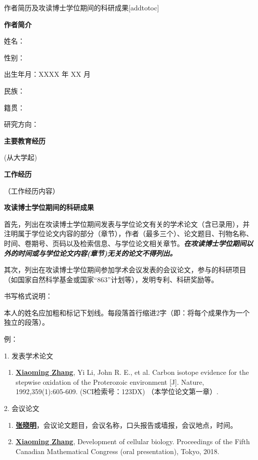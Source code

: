 
\begin{personalcv}{作者简历及攻读博士学位期间的科研成果}[addtotoc]

{\bf 作者简介}

姓名：

性别：

出生年月：XXXX 年 XX 月

民族：

籍贯：

研究方向：

{\bf 主要教育经历}

(从大学起)

{\bf 工作经历}

（工作经历内容）

{\bf 攻读博士学位期间的科研成果}

首先，列出在攻读博士学位期间发表与学位论文有关的学术论文（含已录用），并注明属于学位论文内容的部分（章节），作者（最多三个）、论文题目、刊物名称、时间、卷期号、页码以及检索信息、与学位论文相关章节。{\bfseries\itshape 在攻读博士学位期间以外的时间或与学位论文内容(章节)无关的论文不得列出。}

其次，列出在攻读博士学位期间参加学术会议发表的会议论文，参与的科研项目（如国家自然科学基金或国家“863”计划等），发明专利、科研奖励等。

书写格式说明：

本人的姓名应加粗和标记下划线。每段落首行缩进2字（即：将每个成果作为一个独立的段落）。

例：

1. 发表学术论文
\begin{enumerate}[nosep, label=$\lbrack$\arabic*$\rbrack$]
  \item{\underline{\bf Xiaoming Zhang}, Yi Li, John R. E., et al. Carbon isotope evidence for the stepwise oxidation of the Proterozoic environment [J]. Nature, 1992,359(1):605-609. (SCI检索号：123DX) （本学位论文第一章）.}
\end{enumerate}{}\vspace{1em}

2. 会议论文
\begin{enumerate}[nosep, label=$\lbrack$\arabic*$\rbrack$]
  \item{\underline{\bf 张晓明}，会议论文题目，会议名称，口头报告或墙报，会议地点，时间。}
  \item{\underline{\bf Xiaoming Zhang}, Development of cellular biology. Proceedings of the Fifth Canadian Mathematical Congress (oral presentation), Tokyo, 2018.}
\end{enumerate}{}\vspace{1em}


\end{personalcv}
